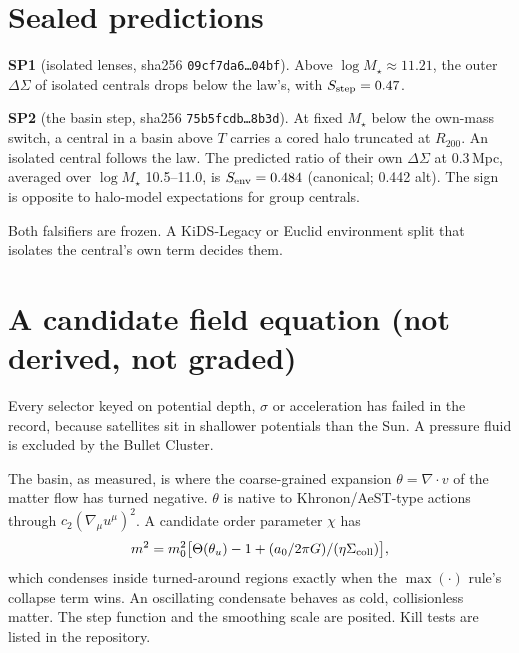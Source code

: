 \documentclass[10pt]{article}
\begin{document}
\section{Sealed predictions}
\textbf{SP1} (isolated lenses, sha256 \texttt{09cf7da6\ldots04bf}). Above $\log M_\star\approx11.21$, the outer $\Delta\Sigma$ of isolated centrals drops below the law's, with $S_{\rm step}=0.47$.

\textbf{SP2} (the basin step, sha256 \texttt{75b5fcdb\ldots8b3d}). At fixed $M_\star$ below the own-mass switch, a central in a basin above $T$ carries a cored halo truncated at $R_{200}$. An isolated central follows the law. The predicted ratio of their own $\Delta\Sigma$ at 0.3\,Mpc, averaged over $\log M_\star$ 10.5--11.0, is $S_{\rm env}=0.484$ (canonical; 0.442 alt). The sign is opposite to halo-model expectations for group centrals.

Both falsifiers are frozen. A KiDS-Legacy or Euclid environment split that isolates the central's own term decides them.

\section{A candidate field equation (not derived, not graded)}
Every selector keyed on potential depth, $\sigma$ or acceleration has failed in the record, because satellites sit in shallower potentials than the Sun. A pressure fluid is excluded by the Bullet Cluster.

The basin, as measured, is where the coarse-grained expansion $\theta=\nabla\!\cdot\!v$ of the matter flow has turned negative. $\theta$ is native to Khronon/AeST-type actions through $c_2(\nabla_\mu u^\mu)^2$. A candidate order parameter $\chi$ has
\[
m^2=m_0^2\big[\Theta(\theta_u)-1+(a_0/2\pi G)/(\eta\Sigma_{\rm coll})\big],
\]
which condenses inside turned-around regions exactly when the $\max(\cdot)$ rule's collapse term wins. An oscillating condensate behaves as cold, collisionless matter. The step function and the smoothing scale are posited. Kill tests are listed in the repository.
\end{document}
